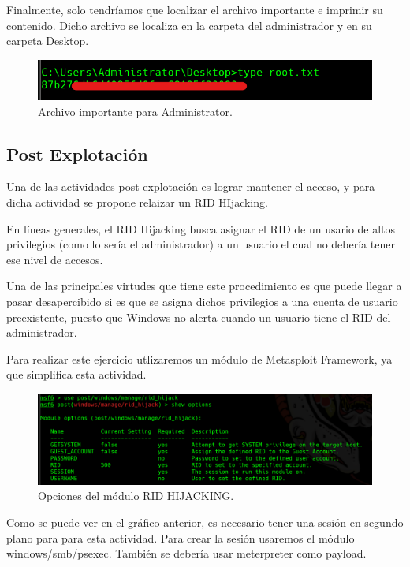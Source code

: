 \documentclass{article}
\begin{document}
Finalmente, solo tendríamos que localizar el archivo importante e imprimir su contenido. Dicho archivo se localiza en la carpeta del administrador y en su carpeta Desktop.

\begin{figure}[H]
	\center
	\includegraphics[width=\textwidth/2]{images/forest/rootflag.png}
	\caption{Archivo importante para Administrator.}
\end{figure}


\subsection{Post Explotación}
Una de las actividades post explotación es lograr mantener el acceso, y para dicha actividad se propone relaizar un RID HIjacking. 

En líneas generales, el RID Hijacking busca asignar el RID de un usario de altos privilegios (como lo sería el administrador) a un usuario el cual no debería tener ese nivel de accesos. 

Una de las principales virtudes que tiene este procedimiento es que puede llegar a pasar desapercibido si es que se asigna dichos privilegios a una cuenta de usuario preexistente, puesto que Windows no alerta cuando un usuario tiene el RID del administrador. 

Para realizar este ejercicio utlizaremos un módulo de Metasploit Framework, ya que simplifica esta actividad. 

\begin{figure}[H]
	\center
	\includegraphics[width=\textwidth/2]{images/forest/Post_Msf_latool.png}
	\caption{Opciones del módulo RID HIJACKING.}
\end{figure}

Como se puede ver en el gráfico anterior, es necesario tener una sesión en segundo plano para para esta actividad. Para crear la sesión usaremos el módulo windows/smb/psexec. También se debería usar meterpreter como payload.
\end{document}
